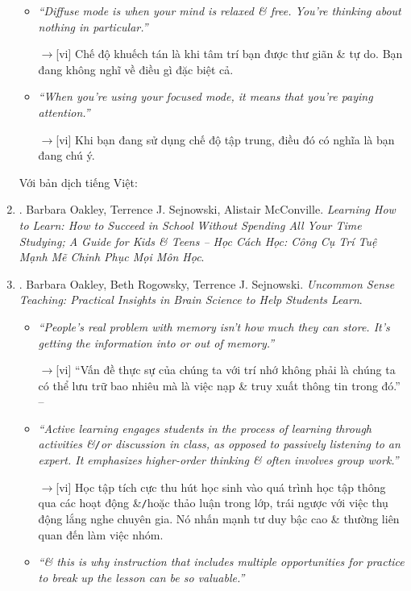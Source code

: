 \documentclass[12pt,oneside]{book}
\begin{document}
\begin{enumerate}
\begin{itemize}
		\item {\it``Diffuse mode is when your mind is relaxed \& free. You're thinking about nothing in particular.''}
		
		{\sf[en]$\to$[vi]} Chế độ khuếch tán là khi tâm trí bạn được thư giãn \& tự do. Bạn đang không nghĩ về điều gì đặc biệt cả.
		
		\item {\it``When you're using your focused mode, it means that you're paying attention.''}
		
		{\sf[en]$\to$[vi]} Khi bạn đang sử dụng chế độ tập trung, điều đó có nghĩa là bạn đang chú ý.
	\end{itemize}
	Với bản dịch tiếng Việt:
	\item \cite{Oakley_Sejnowski_McConville_learn_how_learn_VN}. {\sc Barbara Oakley, Terrence J. Sejnowski, Alistair McConville}. {\it Learning How to Learn: How to Succeed in School Without Spending All Your Time Studying; A Guide for Kids \& Teens -- Học Cách Học: Công Cụ Trí Tuệ Mạnh Mẽ Chinh Phục Mọi Môn Học}.
	\item \cite{Oakley_Rogowsky_Sejnowski_McConville_uncommon_sense_teaching}. {\sc Barbara Oakley, Beth Rogowsky, Terrence J. Sejnowski}. {\it Uncommon Sense Teaching: Practical Insights in Brain Science to Help Students Learn}.
	\begin{itemize}
		\item {\it``People's real problem with memory isn't how much they can store. It's getting the information into or out of memory.''}
		
		{\sf[en]$\to$[vi]} ``Vấn đề thực sự của chúng ta với trí nhớ không phải là chúng ta có thể lưu trữ bao nhiêu mà là việc nạp \& truy xuất thông tin trong đó.'' -- \cite[p. 19]{Oakley_Rogowsky_Sejnowski_McConville_uncommon_sense_teaching_VN}
		
		\item {\it``Active learning engages students in the process of learning through activities \&{\tt/}or discussion in class, as opposed to passively listening to an expert. It emphasizes higher-order thinking \& often involves group work.''}
		
		{\sf[en]$\to$[vi]} Học tập tích cực thu hút học sinh vào quá trình học tập thông qua các hoạt động \&{\tt/}hoặc thảo luận trong lớp, trái ngược với việc thụ động lắng nghe chuyên gia. Nó nhấn mạnh tư duy bậc cao \& thường liên quan đến làm việc nhóm.
		
		\item {\it``\& this is why instruction that includes multiple opportunities for practice to break up the lesson can be so valuable.''}
		

\end{itemize}
\end{enumerate}
\end{document}
